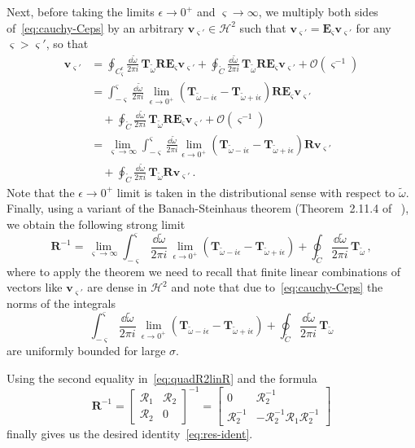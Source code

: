 \documentclass[aps, prd, amsmath, floats, floatfix, twocolumn, nofootinbib, superscriptaddress, showpacs]{revtex4-1}
\def\oo{\infty}
\def\H{\mathcal{H}}
\def\E{\mathbf{E}}
\def\R{\mathbf{R}}
\def\T{\mathbf{T}}
\def\cR{\mathcal{R}}
\def\tomega{{\tilde{\omega}}}
\begin{document}
Next, before taking the limits $\epsilon \to 0^+$ and $\varsigma \to
\oo$, we multiply both sides of~\eqref{eq:cauchy-Ceps} by an arbitrary
$\mathbf{v}_{\varsigma'} \in \H^2$ such that $\mathbf{v}_{\varsigma'} =
\E_{\varsigma} \mathbf{v}_{\varsigma'}$ for any $\varsigma >
\varsigma'$, so that
\begin{align*}
\mathbf{v}_{\varsigma'}
&= \oint_{C^\epsilon_\varsigma} \frac{\dd\tomega}{2\pi i} \,
\T_\tomega \R \E_\varsigma \mathbf{v}_{\varsigma'}
+ \oint_{\mathring{C}} \frac{\dd\tomega}{2\pi i} \,
\T_\tomega \R \E_\varsigma \mathbf{v}_{\varsigma'}
+ \mathcal{O}(\varsigma^{-1}) \\
&= \int_{-\varsigma}^\varsigma \frac{\dd\tomega}{2\pi i} \,
\lim_{\epsilon\to 0^+} (\T_{\tomega-i\epsilon} -
\T_{\tomega+i\epsilon}) \R \E_\varsigma \mathbf{v}_{\varsigma'} \\
& \quad {}
+ \oint_{\mathring{C}} \frac{\dd\tomega}{2\pi i} \,
\T_\tomega \R \E_\varsigma \mathbf{v}_{\varsigma'}
+ \mathcal{O}(\varsigma^{-1}) \\
&= \lim_{\varsigma\to \oo} \int_{-\varsigma}^\varsigma
\frac{\dd\tomega}{2\pi i} \lim_{\epsilon\to 0^+} 
(\T_{\tomega-i\epsilon} - \T_{\tomega+i\epsilon}) \R \mathbf{v}_{\varsigma'} \\
& \quad {}
+ \oint_{\mathring{C}} \frac{\dd\tomega}{2\pi i} \,
\T_\tomega \R \mathbf{v}_{\varsigma'} \, .
\end{align*}
Note that the $\epsilon \to 0^+$ limit is taken in the distributional
sense with respect to $\tomega$. Finally, using a variant of the
Banach-Steinhaus theorem (Theorem~2.11.4 of ~\cite{HillePhillips}), we obtain the
following strong limit
\begin{equation*} %
\R^{-1}
= \lim_{\varsigma \to \oo} \int_{-\varsigma}^\varsigma
\frac{\dd \tomega}{2\pi i} \,
\lim_{\epsilon\to 0^+} (\T_{\tomega-i\epsilon} - \T_{\tomega+i\epsilon})
+ \oint_{\mathring{C}} \frac{\dd\tomega}{2\pi i} \, \T_\tomega \, ,
\end{equation*}
where to apply the theorem we need to recall that finite linear
combinations of vectors like $\mathbf{v}_{\varsigma'}$ are dense in
$\H^2$ and note that due to~\eqref{eq:cauchy-Ceps} the norms of the
integrals
\[
\int_{-\varsigma}^\varsigma \frac{\dd \tomega}{2\pi i}\,
\lim_{\epsilon\to 0^+} (\T_{\tomega-i\epsilon} - \T_{\tomega+i\epsilon})
+ \oint_{\mathring{C}} \frac{\dd\tomega}{2\pi i} \, \T_\tomega
\]
are uniformly bounded for large $\sigma$.

Using the second equality in~\eqref{eq:quadR2linR} and the formula
\begin{equation}
\R^{-1}
= \begin{bmatrix}
\cR_1 & \cR_2 \\
\cR_2 & 0
\end{bmatrix}^{-1}
= \begin{bmatrix}
0 & \cR_2^{-1} \\
\cR_2^{-1} & -\cR_2^{-1} \cR_1 \cR_2^{-1}
\end{bmatrix}
\end{equation}
finally gives us the desired identity~\eqref{eq:res-ident}.
\end{document}
